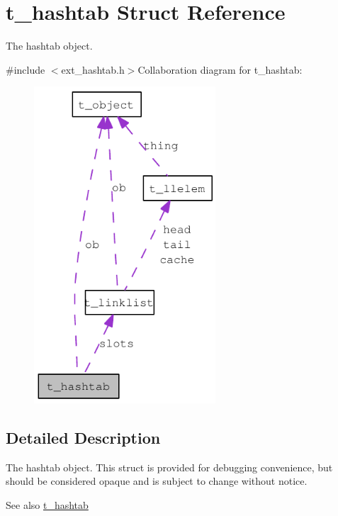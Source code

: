 \hypertarget{structt__hashtab}{
\section{t\_\-hashtab Struct Reference}
\label{structt__hashtab}
}


The hashtab object.  


{\ttfamily \#include $<$ext\_\-hashtab.h$>$}Collaboration diagram for t\_\-hashtab:\nopagebreak
\begin{figure}[H]
\begin{center}
\leavevmode
\includegraphics[width=192pt]{structt__hashtab__coll__graph}
\end{center}
\end{figure}


\subsection{Detailed Description}
The hashtab object. This struct is provided for debugging convenience, but should be considered opaque and is subject to change without notice.

\begin{DoxySeeAlso}{See also}
\hyperlink{structt__hashtab}{t\_\-hashtab} 
\end{DoxySeeAlso}
